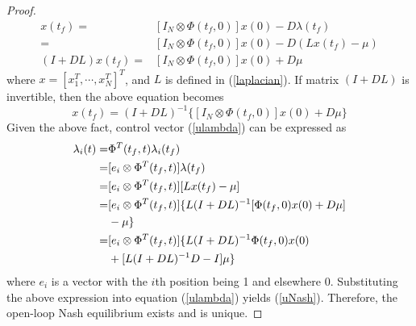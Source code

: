\documentclass[10pt,doublecolumn]{IEEEtran}  %
\begin{document}
\begin{proof}
\begin{align*}
x(t_f)=&[I_N\otimes \Phi(t_f,0)]x(0)-D\lambda(t_f)\\
=&[I_N\otimes \Phi(t_f,0)]x(0)-D(Lx(t_f)-\mu)\\
(I+DL)x(t_f)=&[I_N\otimes\Phi(t_f,0)]x(0)+D\mu
\end{align*}
where $x=[x^T_{1},\cdots,x^T_{N}]^T$, and $L$ is defined in (\ref{laplacian}). If matrix $(I+DL)$ is invertible, then the above equation becomes
\begin{equation}
x(t_f)=(I+DL)^{-1}\{[I_N\otimes\Phi(t_f,0)]x(0)+D\mu\}\label{pfp0}
\end{equation}
Given the above fact, control vector (\ref{ulambda}) can be expressed as
\begin{align}
\lambda_i(t)=& \Phi^T(t_f,t)\lambda_i(t_f)\notag\\
=&[e_i\otimes\Phi^T(t_f,t)]\lambda(t_f)\notag\\
=& [e_i\otimes\Phi^T(t_f,t)] [Lx(t_f)-\mu]\notag\\
=& [e_i\otimes\Phi^T(t_f,t)] \{L(I+DL)^{-1}[\Phi(t_f,0)x(0)+D\mu]\notag\\
&-\mu\}\label{ulamdapv}\notag\\
=& [e_i\otimes\Phi^T(t_f,t)] \{L(I+DL)^{-1}\Phi(t_f,0)x(0)\notag\\
&+[L(I+DL)^{-1}D-I]\mu\}
\end{align}
where $e_i$ is a vector with the $i$th position being 1 and elsewhere 0. Substituting the above expression into equation (\ref{ulambda}) yields (\ref{uNash}). Therefore, the open-loop Nash equilibrium exists and is unique.
\end{proof}
\end{document}
